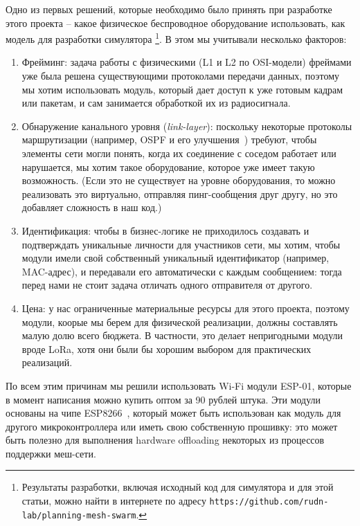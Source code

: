 \documentclass[%
]{report}
\begin{document}
Одно из первых решений, которые необходимо было принять при разработке этого проекта --
какое физическое беспроводное оборудование использовать, как модель для разработки
симулятора \footnote{Результаты разработки, включая исходный код для симулятора и для этой статьи, можно найти в интернете по адресу \texttt{https://github.com/rudn-lab/planning-mesh-swarm}.}.
В этом мы учитывали несколько факторов:

\begin{enumerate}
\item Фрейминг: задача работы с физическими (L1 и L2 по OSI-модели) фреймами уже была решена существующими протоколами передачи данных,
поэтому мы хотим использовать модуль, который дает доступ к уже готовым кадрам или пакетам, и сам занимается обработкой их из радиосигнала.
\item Обнаружение канального уровня (\emph{link-layer}): поскольку некоторые протоколы маршрутизации (например, OSPF и его улучшения~\cite{rfc5614}) требуют,
чтобы элементы сети могли понять, когда их соединение с соседом работает или нарушается,
мы хотим такое оборудование, которое уже имеет такую возможность.
(Если это не существует на уровне оборудования, то можно реализовать это виртуально,
отправляя пинг-сообщения друг другу,
но это добавляет сложность в наш код.)

\item Идентификация: чтобы в бизнес-логике не приходилось создавать и подтверждать уникальные личности для участников сети,
мы хотим, чтобы модули имели свой собственный уникальный идентификатор (например, MAC-адрес),
и передавали его автоматически с каждым сообщением:
тогда перед нами не стоит задача отличать одного отправителя от другого. 

\item Цена: у нас ограниченные материальные ресурсы для этого проекта, поэтому модули, коорые мы берем для физической реализации,
должны составлять малую долю всего бюджета.
В частности, это делает непригодными модули вроде LoRa,
хотя они были бы хорошим выбором для практических реализаций.
\end{enumerate}

По всем этим причинам мы решили использовать Wi-Fi модули ESP-01,
которые в момент написания можно купить оптом за 90 рублей штука.
Эти модули основаны на чипе ESP8266~\cite{esp8266},
который может быть использован как модуль для другого микроконтроллера
или иметь свою собственную прошивку:
это может быть полезно для выполнения hardware offloading
некоторых из процессов поддержки меш-сети.
\end{document}
